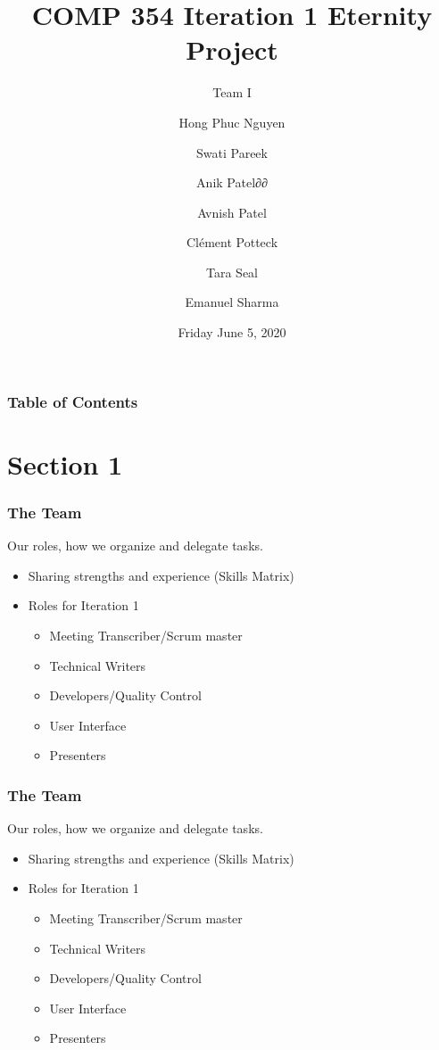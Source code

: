 \documentclass{beamer}
\title{COMP 354 Iteration 1 Eternity Project}
\subtitle{Team I}
\author
  {Hong Phuc Nguyen 
  \and Swati Pareek 
  \and Anik Patel∂∂
  \and Avnish Patel 
  \and Clément Potteck 
  \and Tara Seal 
  \and Emanuel Sharma
  }
\institute{Concordia University}
\date{Friday June 5, 2020}
\begin{document}
  \frame{\titlepage}

  \begin{frame}
  \frametitle{Table of Contents}
  \tableofcontents
  \end{frame}

  \section{Section 1}

  \begin{frame}
  \frametitle{The Team}
  Our roles, how we organize and delegate tasks.
  \begin{itemize}
   \item Sharing strengths and experience (Skills Matrix)
   \item Roles for Iteration 1
    \begin{itemize}
     \item Meeting Transcriber/Scrum master
     \item Technical Writers
     \item Developers/Quality Control
     \item User Interface
     \item Presenters
    \end{itemize}
   \end{itemize}
  \end{frame}



  \begin{frame}
  \frametitle{The Team}
  Our roles, how we organize and delegate tasks.
  \begin{itemize}
   \item Sharing strengths and experience (Skills Matrix)
   \item Roles for Iteration 1
    \begin{itemize}
     \item Meeting Transcriber/Scrum master
     \item Technical Writers
     \item Developers/Quality Control
     \item User Interface
     \item Presenters
    \end{itemize}
   \end{itemize}
  \end{frame}
\end{document}
